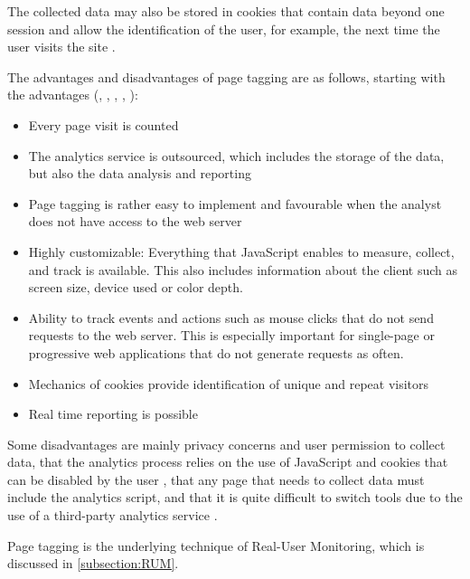 The collected data may also be stored in cookies that contain data beyond one session and allow the identification of the user, for example, the next time the user visits the site \cite{2019Kumar}.

The advantages and disadvantages of page tagging are as follows, starting with the advantages (\cite{2009Waisberg}, \cite{2011Nakatani}, \cite{2011Marek}, \cite{2014Singal}, \cite{2015Zheng}):



\begin{itemize}
\item Every page visit is counted %
\item The analytics service is outsourced, which includes the storage of the data, but also the data analysis and reporting %
\item Page tagging is rather easy to implement and favourable when the analyst does not have access to the web server %
\item Highly customizable: Everything that JavaScript enables to measure, collect, and track is available. This also includes information about the client such as screen size, device used or color depth. %
\item Ability to track events and actions such as mouse clicks that do not send requests to the web server. This is especially important for single-page or progressive web applications that do not generate requests as often.  %
\item Mechanics of cookies provide identification of unique and repeat visitors %
\item Real time reporting is possible %
\end{itemize}


Some disadvantages are mainly privacy concerns and user permission to collect data, that the analytics process relies on the use of JavaScript and cookies that can be disabled by the user \cite{2011Marek}, that any page that needs to collect data must include the analytics script, and that it is quite difficult to switch tools due to the use of a third-party analytics service \cite{2014Singal}.

Page tagging is the underlying technique of Real-User Monitoring, which is discussed in \ref{subsection:RUM}.

